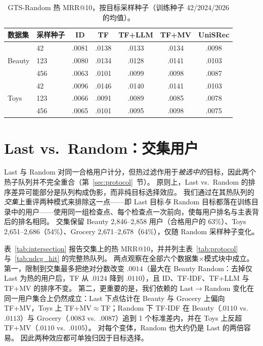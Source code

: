 \documentclass[sigconf,natbib=true,anonymous]{acmart}
\newcommand{\tfidf}{\textsc{TF-IDF}\xspace}
\newcommand{\tfllm}{\textsc{TF+LLM}\xspace}
\newcommand{\tfmv}{\textsc{TF+MV}\xspace}
\begin{document}
\begin{table}[h]
\centering
\caption{GTS-Random 热 MRR@10，按目标采样种子（训练种子 42/2024/2026 的均值）。}
\label{tab:random-seeds}
\small
\setlength{\tabcolsep}{3pt}
\begin{tabular}{@{}llccccc@{}}
\toprule
数据集 & 采样种子 & ID & TF & TF+LLM & TF+MV & UniSRec \\
\midrule
\multirow{3}{*}{Beauty}
 & 42    & .0081 & .0138 & .0133 & .0134 & .0098 \\
 & 123   & .0080 & .0134 & .0128 & .0141 & .0103 \\
 & 456   & .0063 & .0101 & .0099 & .0098 & .0087 \\
\midrule
\multirow{3}{*}{Toys}
 & 42    & .0096 & .0146 & .0140 & .0141 & .0103 \\
 & 123   & .0066 & .0091 & .0089 & .0085 & .0078 \\
 & 456   & .0065 & .0101 & .0095 & .0098 & .0075 \\
\bottomrule
\end{tabular}
\end{table}

\section{Last vs.\ Random：交集用户}
\label{app:intersection}

Last 与 Random 对同一合格用户计分，但热过滤作用于\emph{被选中的}目标，因此两个热子队列并不完全重合（第~\ref{sec:protocol}~节）。
原则上，Last vs.\ Random 的排序差异可能部分是队列构成伪影，而非纯目标选择效应。
我们通过在其热队列的\emph{交集}上重评两种模式来排除这一点——即 Last 目标\emph{与} Random 目标都落在训练目录中的用户——使用同一组检查点、每个检查点一次前向，使每用户排名与主表背后的排名相同。
交集保留 Beauty 2{,}846--2{,}858 用户（合格用户的 63\%）、Toys 2{,}651--2{,}686（54\%）、Grocery 2{,}671--2{,}678（64\%），仅随 Random 采样种子变化。

表~\ref{tab:intersection} 报告交集上的热 MRR@10，并并列主表~\ref{tab:protocol} 与~\ref{tab:ndcg_hit} 的完整热队列。
两点观察在全部六个数据集$\times$模式块中成立。
第一，限制到交集最多把绝对分数改变 $.0014$（最大在 Beauty Random：去掉仅 Last 为热的用户后，TF 从 $.0124$ 降到 $.0110$），且 ID、\tfidf、\tfllm 与 \tfmv 的排序不变。
第二，更重要的是，我们依赖的 Last$\to$Random 变化在同一用户集合上仍然成立：Last 下点估计在 Beauty 与 Grocery 上偏向 \tfmv，Toys 上 TF+MV${}\approx{}$TF；Random 下 \tfidf 在 Beauty（$.0110$ vs.\ $.0113$）与 Grocery（$.0083$ vs.\ $.0087$）追到 1 个标准差内，并在 Toys 上反超 \tfmv（$.0110$ vs.\ $.0105$）。
对每个变体，Random 也大约仍是 Last 的两倍容易。
因此两种效应都可单独归因于目标选择。
\end{document}
